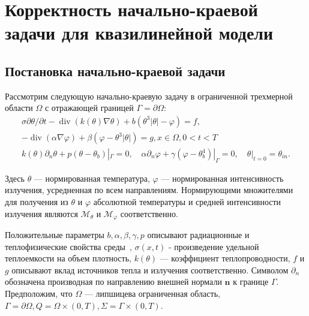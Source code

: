 \section{Корректность начально-краевой задачи для квазилинейной модели}
\label{sec:ch3:sec1}

\subsection{Постановка начально-краевой задачи}
\label{subsec:ch3/sec1/model}

Рассмотрим следующую начально-краевую задачу
в ограниченной трехмерной области $\Omega$ с
отражающей границей $\Gamma=\partial \Omega$:
\begin{gather}
    \sigma \partial \theta / \partial t
    -\operatorname{div}(k(\theta) \nabla \theta)
    +b\left(\theta^{3}|\theta|
    -\varphi\right)=f, \label{eq:3_1:1} \\
    -\operatorname{div}(\alpha \nabla \varphi)
    + \beta\left(\varphi-\theta^{3}|\theta|\right)=g,
    x \in \Omega, 0<t<T \label{eq:3_1:2}\\
    k(\theta) \partial_{n} \theta
    + p\left(\theta-\theta_{b}\right)|_{\Gamma}=0,
    \quad \alpha \partial_{n} \varphi
    + \gamma\left(\varphi-\theta_{b}^{4}\right)|_{\Gamma}=0,
    \quad \theta|_{t=0}=\theta_{i n}. \label{eq:3_1:3}
\end{gather}



Здесь $\theta$ — нормированная температура, $\varphi$ — нормированная интенсивность излучения,
усредненная по всем направлениям.
Нормирующими множителями для получения из
$\theta$ и $\varphi$ абсолютной температуры и средней интенсивности излучения
являются $\mathcal{M}_{\theta}$ и $\mathcal{M}_{\varphi}$ соответственно.


Положительные параметры $b, \alpha, \beta, \gamma, p$ описывают радиационные
и теплофизические свойства среды~\cite{Chebotarev2017}, $\sigma(x, t)$ - произведение
удельной теплоемкости на объем плотность, $k(\theta)$ — коэффициент теплопроводности,
$f$ и $g$ описывают вклад источников тепла и излучения соответственно.
Символом $\partial_{n}$ обозначена производная по направлению внешней
нормали $\mathbf{n}$ к границе $\Gamma$.
Предположим, что $\Omega$ — липшицева ограниченная область,
$\Gamma=\partial \Omega, Q=\Omega \times(0, T), \Sigma=\Gamma \times(0, T)$.


